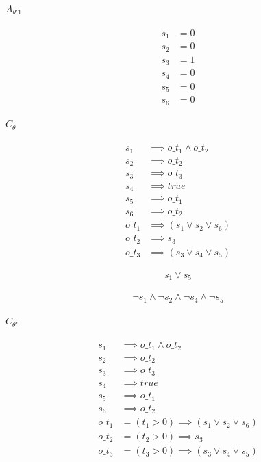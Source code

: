 \documentclass{article}
\begin{document}
\paragraph{$A_{\theta'1}$}
\begin{align*}
  s_1 &= 0 \\
  s_2 &= 0 \\
  s_3 &= 1 \\
  s_4 &= 0 \\
  s_5 &= 0 \\
  s_6 &= 0
\end{align*}

\paragraph{$C_\theta$}

\begin{align*}
  s_1 &\implies o\_t_1 \land o\_t_2 \\
  s_2 &\implies o\_t_2 \\
  s_3 &\implies o\_t_3 \\
  s_4 &\implies true \\
  s_5 &\implies o\_t_1 \\
  s_6 &\implies o\_t_2 \\
  o\_t_1 &\implies (s_1 \lor s_2 \lor s_6) \\
  o\_t_2 &\implies s_3 \\
  o\_t_3 &\implies (s_3 \lor s_4 \lor s_5)
\end{align*}

\begin{align*}
  s_1 \lor s_5
\end{align*}

\begin{align*}
  \neg s_1 \land \neg s_2 \land \neg s_4 \land \neg s_5
\end{align*}

\paragraph{$C_{\theta'}$}

\begin{align*}
  s_1 &\implies o\_t_1 \land o\_t_2 \\
  s_2 &\implies o\_t_2 \\
  s_3 &\implies o\_t_3 \\
  s_4 &\implies true \\
  s_5 &\implies o\_t_1 \\
  s_6 &\implies o\_t_2 \\
  o\_t_1 &= (t_1 > 0) \implies (s_1 \lor s_2 \lor s_6) \\
  o\_t_2 &= (t_2 > 0) \implies s_3 \\
  o\_t_3 &= (t_3 > 0) \implies (s_3 \lor s_4 \lor s_5)
\end{align*}
\end{document}
